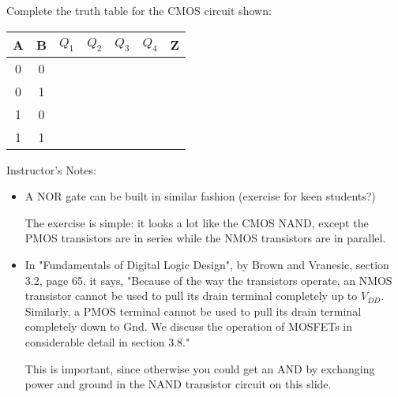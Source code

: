 \begin{frame}[fragile]
\begin{multicols}{2}
    
\columnbreak
  \begin{tcolorbox}[enhanced,attach boxed title to top center={yshift=-3mm,yshifttext=-1mm},
  colback=red!5!white,colframe=red!75!black,colbacktitle=red!80!black,
  title=Try this,fonttitle=\bfseries,
  boxed title style={size=small,colframe=red!50!black} ]
  Complete the truth table for the CMOS circuit shown:
  \begin{center}   
  \small
\begin{tabular}{cc|cccc|c}
A	& B	& $Q_1$	& $Q_2$	& $Q_3$	& $Q_4$	& Z\\
\hline
0	& 0	& 	& 	& 	& 	& \\
0	& 1	& 	&	&	&	&\\
1	& 0	& 	&	&	&	&\\
1	& 1	& 	&	&	&	&
\end{tabular}
   \end{center}
\end{tcolorbox}
\end{multicols}

\end{frame}
\BNotes\ifnum{}
\begin{frame}[fragile]
Instructor's Notes:
\begin{itemize}
\item A NOR gate can be built in similar fashion (exercise for keen students?)

	The exercise is simple: it looks a lot like the CMOS NAND, except the
	PMOS transistors are in series while the NMOS transistors are in
	parallel.

\item In "Fundamentals of Digital Logic Design", by Brown
	and Vranesic, section 3.2, page 65, it says, "Because of the way the
	transistors operate, an NMOS transistor cannot be used to pull its
	drain terminal completely up to $V_{DD}$. Similarly, a PMOS terminal
	cannot be used to pull its drain terminal completely down to Gnd. We
	discuss the operation of MOSFETs in considerable detail in section
	3.8."

	This is important, since otherwise you could get an AND by exchanging 
	power and ground in the NAND transistor circuit on this slide.

\end{itemize}
\end{frame}
\fi\ENotes


